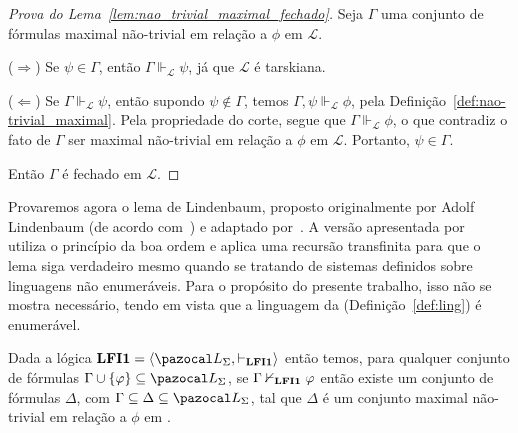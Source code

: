         \begin{proof}[Prova do Lema~\ref{lem:nao_trivial_maximal_fechado}]
            Seja $\Gamma$ uma conjunto de fórmulas maximal não-trivial em relação a $\phi$ em $\mathcal{L}$. 
            
            \noindent($\Longrightarrow$) Se $\psi \in \Gamma$, então $\Gamma \Vdash_{\mathcal{L}} \psi$, já que $\mathcal{L}$ é tarskiana. 
            
            \noindent($\Longleftarrow$) Se $\Gamma \Vdash_{\mathcal{L}} \psi$, então supondo $\psi \notin \Gamma$, temos $\Gamma, \psi \Vdash_{\mathcal{L}} \phi$, pela Definição~\ref{def:nao-trivial_maximal}. Pela propriedade do corte, segue que $\Gamma \Vdash_{\mathcal{L}} \phi$, o que contradiz o fato de $\Gamma$ ser maximal não-trivial em relação a $\phi$ em $\mathcal{L}$. Portanto, $\psi \in \Gamma$.
            
            Então $\Gamma$ é fechado em $\mathcal{L}$.
        \end{proof}





        Provaremos agora o lema de Lindenbaum, proposto originalmente por Adolf Lindenbaum (de acordo com~) e adaptado por~. A versão apresentada por~ utiliza o princípio da boa ordem e aplica uma recursão transfinita para que o lema siga verdadeiro mesmo quando se tratando de sistemas definidos sobre linguagens não enumeráveis. Para o propósito do presente trabalho, isso não se mostra necessário, tendo em vista que a linguagem da \lfium{} (Definição~\ref{def:ling}) é enumerável.

        \begin{lema}\label{lem:lindenbaum}
            Dada a lógica $\lfium{} = \langle \ling, \conhil \rangle$ então temos, para qualquer conjunto de fórmulas $\Gamma \cup \{\phi\} \subseteq \ling$, se $\Gamma \nvdash_{{\normalfont\textbf{LFI1}}{}} \varphi$ então existe um conjunto de fórmulas $\Delta$, com $\Gamma \subseteq \Delta \subseteq \ling$, tal que $\Delta$ é um conjunto maximal não-trivial em relação a $\phi$ em \lfium{}.
        \end{lema}

